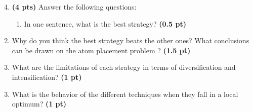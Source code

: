 \documentclass[11pt,a4paper]{report}
\begin{document}
\begin{enumerate}
\setcounter{enumi}{3}
    \item \textbf{(4 pts)} Answer the following questions:
    \begin{enumerate}
        \item In one sentence, what is the best strategy? \textbf{(0.5 pt)}
    \end{enumerate}
\end{enumerate}

\begin{answers}[3.5cm]
\end{answers}


\newpage
\begin{enumerate}
\setcounter{enumi}{3}
\begin{enumerate}
\setcounter{enumii}{1}
    \item Why do you think the best strategy beats the other ones? What conclusions can be drawn on the atom placement problem ? \textbf{(1.5 pt)}
\end{enumerate}
\end{enumerate}

\begin{answers}[7.5cm]
\end{answers}



\begin{enumerate}
\setcounter{enumi}{3}
\begin{enumerate}
\setcounter{enumii}{2}
    \item What are the limitations of each strategy in terms of diversification 
    and intensification? \textbf{(1 pt)}
\end{enumerate}
\end{enumerate}

\begin{answers}[5cm]
\end{answers}



\begin{enumerate}
\setcounter{enumi}{3}
\begin{enumerate}
\setcounter{enumii}{2}
    \item What is the behavior of the different techniques when they fall 
    in a local optimum? \textbf{(1 pt)}
\end{enumerate}
\end{enumerate}

\begin{answers}[5cm]
\end{answers}
\end{document}
